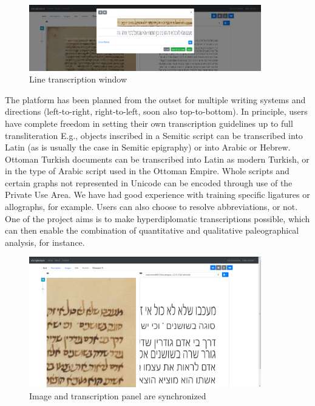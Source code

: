 \begin{figure}
	\centering
	\includegraphics[width=0.9\textwidth]{transcription_window.png}
	\caption{Line transcription window}
	\label{fig_ost:transcription}
\end{figure}

The platform has been planned from the outset for multiple writing systems and
directions (left-to-right, right-to-left, soon also top-to-bottom). In
principle, users have complete freedom in setting their own transcription
guidelines up to full transliteration E.g., objects inscribed in a Semitic
script can be transcribed into Latin (as is usually the case in Semitic
epigraphy) or into Arabic or Hebrew. Ottoman Turkish documents can be
transcribed into Latin as modern Turkish, or in the type of Arabic script used
in the Ottoman Empire.  Whole scripts and certain graphs not represented in
Unicode can be encoded through use of the Private Use Area. We have had good
experience with training specific ligatures or allographs, for example. Users
can also choose to resolve abbreviations, or not. One of the project aims is to
make hyperdiplomatic transcriptions possible, which can then enable the
combination of quantitative and qualitative paleographical analysis, for
instance.\cite{kiessling2019escripta}

\begin{figure}
	\centering
	\includegraphics[width=0.9\textwidth]{zoom.png}
	\caption{Image and transcription panel are synchronized}
	\label{fig_ost:zoom}
\end{figure}

